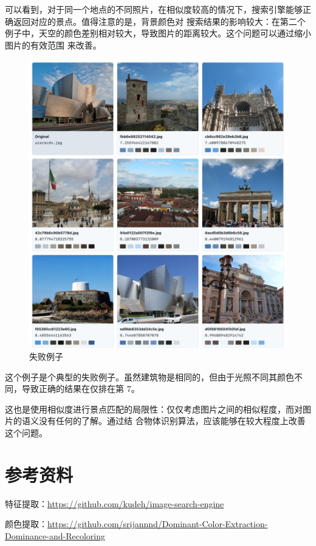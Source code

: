 \documentclass[a4paper]{article}
\begin{document}
可以看到，对于同一个地点的不同照片，在相似度较高的情况下，搜索引擎能够正确返回对应的景点。值得注意的是，背景颜色对
搜索结果的影响较大：在第二个例子中，天空的颜色差别相对较大，导致图片的距离较大。这个问题可以通过缩小图片的有效范围
来改善。

\begin{figure}[H]
    \centering
    \includegraphics[width=\textwidth]{assets/test-2-3.jpg}
    \caption{失败例子}
    \label{fig:search_result_2_3}
\end{figure}

这个例子是个典型的失败例子。虽然建筑物是相同的，但由于光照不同其颜色不同，导致正确的结果在仅排在第 7。

这也是使用相似度进行景点匹配的局限性：仅仅考虑图片之间的相似程度，而对图片的语义没有任何的了解。通过结
合物体识别算法，应该能够在较大程度上改善这个问题。

\section{参考资料}

特征提取：\hyperlink{image-search-engine}{https://github.com/kudeh/image-search-engine}

颜色提取：\hyperlink{Dominant-Color-Extraction-Dominance-and-Recoloring}{https://github.com/srijannnd/Dominant-Color-Extraction-Dominance-and-Recoloring}
\end{document}
